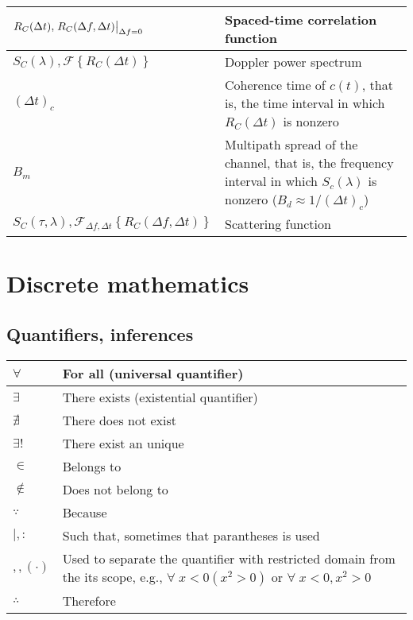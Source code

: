 \documentclass{article}
\begin{document}
\begin{xltabular}{\textwidth}{XX}
    \(R_C(\Delta t), \eval{R_C(\Delta f, \Delta t)}_{\Delta f = 0}\) & Spaced-time correlation function \\ \hline
    \(S_C(\lambda), \mathcal{F}\left\{ R_C (\Delta t) \right\}\) & Doppler power spectrum \\ \hline
    \((\Delta t)_c\) & Coherence time of \(c(t)\), that is, the time interval in which \(R_C(\Delta t)\) is nonzero \\ \hline
    \(B_m\) & Multipath spread of the channel, that is, the frequency interval in which \(S_c(\lambda)\) is nonzero (\(B_d \approx 1/(\Delta t)_c \)) \\ \hline
    \(S_C(\tau, \lambda), \mathcal{F}_{\Delta f, \Delta t}\left\{ R_C (\Delta f, \Delta t) \right\}\) & Scattering function \\ \hline
\end{xltabular}

\section{Discrete mathematics}
\subsection{Quantifiers, inferences}
\begin{xltabular}{\textwidth}{XX}
    \(\forall\) & For all (universal quantifier) \cite{grahamConcreteMathematicsFoundation1989}\\ \hline
    \(\exists\) & There exists (existential quantifier) \cite{grahamConcreteMathematicsFoundation1989}\\ \hline
    \(\nexists\) & There does not exist \cite{grahamConcreteMathematicsFoundation1989}\\ \hline
    \(\exists!\) & There exist an unique \cite{grahamConcreteMathematicsFoundation1989}\\ \hline
    \(\in\) & Belongs to \cite{grahamConcreteMathematicsFoundation1989}\\ \hline
    \(\not\in\) & Does not belong to \cite{grahamConcreteMathematicsFoundation1989}\\ \hline
    \(\because\) & Because \cite{grahamConcreteMathematicsFoundation1989}\\ \hline
    \(\mid, :\) & Such that, sometimes that parantheses is used \cite{grahamConcreteMathematicsFoundation1989}\\ \hline
    \(, , \left( \cdot \right)\) & Used to separate the quantifier with restricted domain from the its scope, e.g., \(\forall \; x < 0 \left( x^{2} > 0 \right)\) or \(\forall \; x < 0, x^{2} > 0\) \cite{grahamConcreteMathematicsFoundation1989}\\ \hline
    \(\therefore\) & Therefore \cite{grahamConcreteMathematicsFoundation1989}\\
\end{xltabular}
\end{document}
